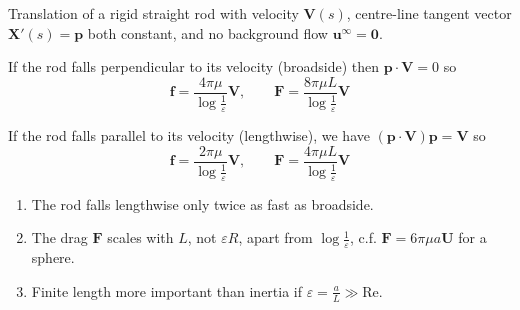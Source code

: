 \documentclass{jknotes}
\renewcommand{\u}{\bm{u}}
\newcommand{\X}{\bm{X}}
\begin{document}
\begin{eg}
	Translation of a rigid straight rod with velocity $\bm{V}(s)$, centre-line
	tangent vector $\X'(s) = \bm{p}$ both constant, and no background flow
	$\u^\infty = \bm{0}$.
	\begin{center}
	\end{center}

	If the rod falls perpendicular to its velocity (broadside) then $\bm{p} \cdot
	\bm{V} = 0$ so
	\begin{equation}
		\bm{f} = \frac{4\pi\mu}{\log \frac{1}{\varepsilon}} \bm{V},
		\hspace{2em} \bm{F} = \frac{8\pi\mu L}{\log
		\frac{1}{\varepsilon}}\bm{V}
	\end{equation}

	If the rod falls parallel to its velocity (lengthwise), we have
	$(\bm{p}\cdot\bm{V})\bm{p} = \bm{V}$ so
	\begin{equation}
		\bm{f} = \frac{2\pi\mu}{\log \frac{1}{\varepsilon}} \bm{V},
		\hspace{2em} \bm{F} = \frac{4\pi\mu L}{\log
		\frac{1}{\varepsilon}}\bm{V}
	\end{equation}

	\begin{enumerate}
		\item The rod falls lengthwise only twice as fast as broadside.
		\item The drag $\bm{F}$ scales with $L$, not $\varepsilon R$, apart
			from $\log \frac{1}{\varepsilon}$, c.f. $\bm{F} = 6\pi\mu a
			\bm{U}$ for a sphere.
		\item Finite length more important than inertia if $\varepsilon =
			\frac{a}{L} \gg \text{Re}$.
		\end{enumerate}
\end{eg}
\end{document}
